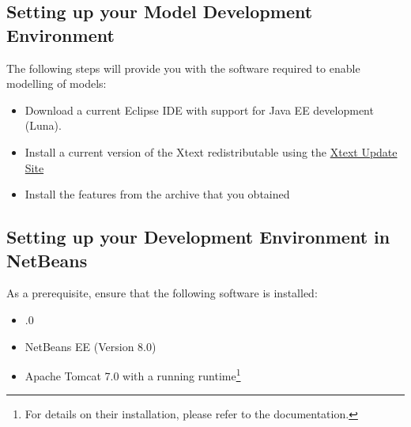
\subsection{Setting up your \MD Model Development Environment}

The following steps will provide you with the software required to enable modelling of \MD models:

\begin{itemize}
\item Download a current Eclipse IDE with support for Java EE development (\eg Luna).
\item Install a current version of the Xtext redistributable using the \href{https://eclipse.org/Xtext/download.html}{Xtext Update Site}
\item Install the \MD features from the archive that you obtained
\end{itemize}


\subsection{Setting up your \mapapps Development Environment in NetBeans}
\label{subsec:basic-setup}

As a prerequisite, ensure that the following software is installed:

\begin{itemize}
\item {}.0
\item NetBeans EE (\eg Version 8.0)
\item Apache Tomcat 7.0 with a running \mapapps runtime\footnote{For details on their installation, please refer to the \mapapps documentation.}
\end{itemize}

